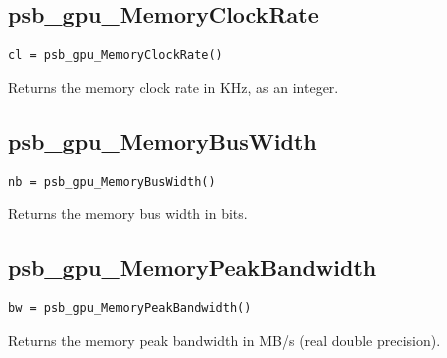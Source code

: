 \subsection*{psb\_gpu\_MemoryClockRate }

\begin{verbatim}
cl = psb_gpu_MemoryClockRate()
\end{verbatim}

Returns the memory clock rate in KHz, as an integer. 

\subsection*{psb\_gpu\_MemoryBusWidth }

\begin{verbatim}
nb = psb_gpu_MemoryBusWidth()
\end{verbatim}

Returns the memory bus width in bits.

\subsection*{psb\_gpu\_MemoryPeakBandwidth }

\begin{verbatim}
bw = psb_gpu_MemoryPeakBandwidth()
\end{verbatim}

Returns the memory peak bandwidth in MB/s (real double precision).



